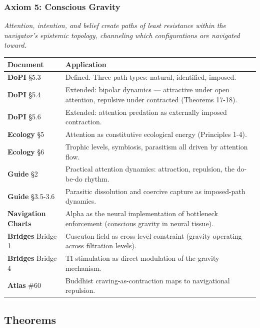 \subsubsection*{Axiom 5: Conscious Gravity}


\textit{Attention, intention, and belief create paths of least resistance within the navigator's epistemic topology, channeling which configurations are navigated toward.}



\begin{longtable}{>{\raggedright\arraybackslash}p{} >{\raggedright\arraybackslash}p{}}
\toprule
\textbf{Document} & \textbf{Application} \\
\midrule
\endhead
\textbf{DoPI} §5.3 & Defined. Three path types: natural, identified, imposed. \\
\textbf{DoPI} §5.4 & Extended: bipolar dynamics — attractive under open attention, repulsive under contracted (Theorems 17-18). \\
\textbf{DoPI} §5.6 & Extended: attention predation as externally imposed contraction. \\
\textbf{Ecology} §5 & Attention as constitutive ecological energy (Principles 1-4). \\
\textbf{Ecology} §6 & Trophic levels, symbiosis, parasitism all driven by attention flow. \\
\textbf{Guide} §2 & Practical attention dynamics: attraction, repulsion, the do-be-do rhythm. \\
\textbf{Guide} §3.5-3.6 & Parasitic dissolution and coercive capture as imposed-path dynamics. \\
\textbf{Navigation Charts} & Alpha as the neural implementation of bottleneck enforcement (conscious gravity in neural tissue). \\
\textbf{Bridges} Bridge 1 & Cuscuton field as cross-level constraint (gravity operating across filtration levels). \\
\textbf{Bridges} Bridge 4 & TI stimulation as direct modulation of the gravity mechanism. \\
\textbf{Atlas} \#60 & Buddhist craving-as-contraction maps to navigational repulsion. \\
\bottomrule
\end{longtable}



\bigskip\noindent\makebox[\textwidth]{\color{rulegray}\rule{5cm}{0.3pt}}\bigskip


\subsection*{Theorems}


